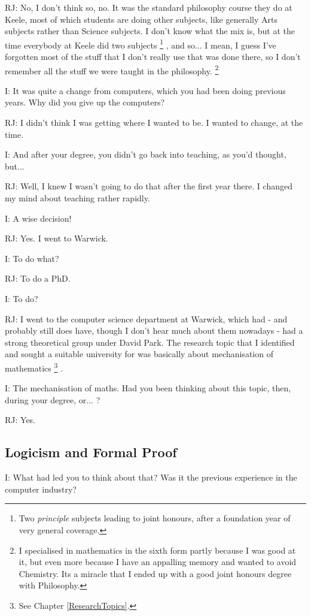 \documentclass[10pt,titlepage]{book}
\begin{document}
RJ: No, I don't think so, no. It was the standard philosophy course they do at Keele, most of which students are doing other subjects, like generally Arts subjects rather than Science subjects.
I don't know what the mix is, but at the time everybody at Keele did two subjects%
\footnote{
Two {\it principle} subjects leading to joint honours, after a foundation year of very general coverage.}%
, and so... I mean, I guess I've forgotten most of the stuff that I don't really use that was done there, so I don't remember all the stuff we were taught in the philosophy.%
\footnote{I specialised in mathematics in the sixth form partly because I was good at it, but even more because I have an appalling memory and wanted to avoid Chemistry.
Its a miracle that I ended up with a good joint honours degree with Philosophy.}

I: It was quite a change from computers, which you had been doing previous years. Why did you give up the computers?

RJ: I didn't think I was getting where I wanted to be. I wanted to change, at the time.

I: And after your degree, you didn't go back into teaching, as you'd thought, but...

RJ: Well, I knew I wasn't going to do that after the first year there. I changed my mind about teaching rather rapidly.

I: A wise decision!

RJ: Yes. I went to Warwick.

I: To do what?

RJ: To do a PhD.

I: To do?

RJ: I went to the computer science department at Warwick, which had - and probably still does have, though I don't hear much about them nowadays - had a strong theoretical group under David Park. The research topic that I identified and sought a suitable university for was basically about mechanisation of mathematics%
\footnote{
See Chapter \ref{ResearchTopics}.}%
.

I: The mechanisation of maths. Had you been thinking about this topic, then, during your degree, or... ?

RJ: Yes.

\subsection{Logicism and Formal Proof}

I: What had led you to think about that? Was it the previous experience in the computer industry?
\end{document}
